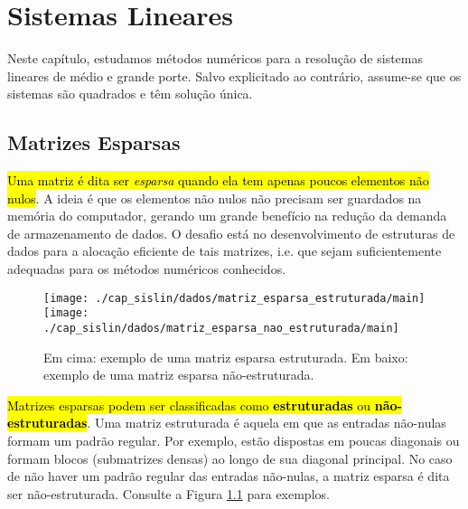
\chapter{Sistemas Lineares}\label{cap_sislin}

Neste capítulo, estudamos métodos numéricos para a resolução de sistemas lineares de médio e grande porte. Salvo explicitado ao contrário, assume-se que os sistemas são quadrados e têm solução única.

\section{Matrizes Esparsas}\label{cap_sislin_sec_matesparsa}

\hl{Uma matriz é dita ser \emph{esparsa} quando ela tem apenas poucos elementos não nulos}. A ideia é que os elementos não nulos não precisam ser guardados na memória do computador, gerando um grande benefício na redução da demanda de armazenamento de dados. O desafio está no desenvolvimento de estruturas de dados para a alocação eficiente de tais matrizes, i.e. que sejam suficientemente adequadas para os métodos numéricos conhecidos.

\begin{figure}[H]
  \centering
  \texttt{[image: ./cap\_sislin/dados/matriz\_esparsa\_estruturada/main]}\\
  \texttt{[image: ./cap\_sislin/dados/matriz\_esparsa\_nao\_estruturada/main]}
  \caption{Em cima: exemplo de uma matriz esparsa estruturada. Em baixo: exemplo de uma matriz esparsa não-estruturada.}
  \label{fig:ex_matriz_esparsa_estrutura}
\end{figure}

\hl{Matrizes esparsas podem ser classificadas como \textbf{estruturadas} ou \textbf{não-estruturadas}}. Uma matriz estruturada é aquela em que as entradas não-nulas formam um padrão regular. Por exemplo, estão dispostas em poucas diagonais ou formam blocos (submatrizes densas) ao longo de sua diagonal principal. No caso de não haver um padrão regular das entradas não-nulas, a matriz esparsa é dita ser não-estruturada. Consulte a Figura \ref{fig:ex_matriz_esparsa_estrutura} para exemplos.

